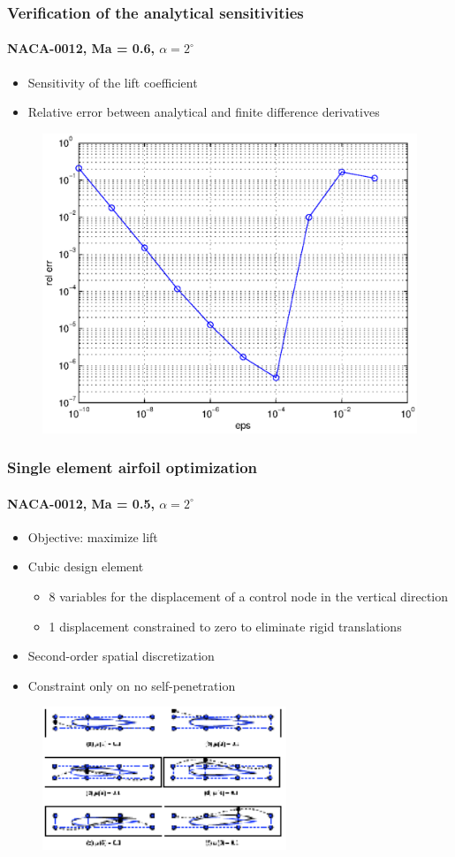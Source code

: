 \begin{frame}
  \frametitle{Verification of the analytical sensitivities}  
  \framesubtitle{NACA-0012, Ma = 0.6, $\alpha=2^\circ$}
  \begin{itemize}
    \item Sensitivity of the lift coefficient 
    \item Relative error between analytical and finite difference derivatives
  \end{itemize}
  \begin{figure}[!ht]
    \centering
    \includegraphics[width=0.6\linewidth]{Fig/err_sc}
  \end{figure}
\end{frame}


\begin{frame}
  \frametitle{Single element airfoil optimization}
  \framesubtitle{NACA-0012, Ma = 0.5, $\alpha=2^\circ$}
  \begin{itemize}
  \item Objective: maximize lift
  \item Cubic design element 
    \begin{itemize}
    \item 8 variables for the displacement of a control node in the vertical direction
    \item 1 displacement constrained to zero to eliminate rigid translations
    \end{itemize}
  \item Second-order spatial discretization
  \item Constraint only on no self-penetration
  \end{itemize}
  \vspace{2mm}
   \begin{figure}
    \centering
    \includegraphics[width=0.65\textwidth]{Fig/nacadef}
  \end{figure}
\end{frame}

